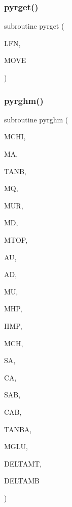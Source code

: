 \subsubsection{\texorpdfstring{pyrget()}{pyrget()}}
{\footnotesize\ttfamily subroutine pyrget (\begin{DoxyParamCaption}\item[{}]{L\+FN,  }\item[{}]{M\+O\+VE }\end{DoxyParamCaption})}

\mbox{\label{pythia-6_84_824_8f_a623bc0a2928b826db2adab2e3c046236}} 
\subsubsection{\texorpdfstring{pyrghm()}{pyrghm()}}
{\footnotesize\ttfamily subroutine pyrghm (\begin{DoxyParamCaption}\item[{}]{M\+C\+HI,  }\item[{}]{MA,  }\item[{}]{T\+A\+NB,  }\item[{}]{MQ,  }\item[{}]{M\+UR,  }\item[{}]{MD,  }\item[{}]{M\+T\+OP,  }\item[{}]{AU,  }\item[{}]{AD,  }\item[{}]{MU,  }\item[{}]{M\+HP,  }\item[{}]{H\+MP,  }\item[{}]{M\+CH,  }\item[{}]{SA,  }\item[{}]{CA,  }\item[{}]{S\+AB,  }\item[{}]{C\+AB,  }\item[{}]{T\+A\+N\+BA,  }\item[{}]{M\+G\+LU,  }\item[{}]{D\+E\+L\+T\+A\+MT,  }\item[{}]{D\+E\+L\+T\+A\+MB }\end{DoxyParamCaption})}

\mbox{\label{pythia-6_84_824_8f_a705b41dadabcda252bc3016ab7637a1c}} 
